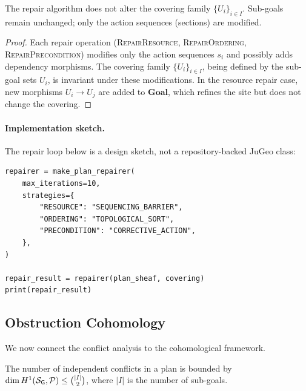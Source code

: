 \documentclass[11pt]{article}
\newcommand{\PlanSheaf}{\mathcal{P}}
\newcommand{\GoalSite}{\Site_{\mathsf{G}}}
\newcommand{\SubGoal}[1]{U_{#1}}
\newcommand{\CoverFam}{\{U_i\}_{i \in I}}
\newcommand{\GoalCat}{\mathbf{Goal}}
\begin{document}
\begin{lemma}\label{lem:repair-cover}
  The repair algorithm does not alter the covering family
  $\CoverFam$.  Sub-goals remain unchanged; only the action
  sequences (sections) are modified.
\end{lemma}

\begin{proof}
  Each repair operation (\textsc{RepairResource},
  \textsc{RepairOrdering}, \textsc{RepairPrecondition}) modifies
  only the action sequences $s_i$ and possibly adds dependency
  morphisms.  The covering family $\CoverFam$, being defined
  by the sub-goal sets $\SubGoal{i}$, is invariant under these
  modifications.  In the resource repair case, new morphisms
  $\SubGoal{i} \to \SubGoal{j}$ are added to $\GoalCat$, which
  refines the site but does not change the covering.
\end{proof}

\paragraph{Implementation sketch.}
The repair loop below is a design sketch, not a repository-backed JuGeo
class:

\begin{lstlisting}
repairer = make_plan_repairer(
    max_iterations=10,
    strategies={
        "RESOURCE": "SEQUENCING_BARRIER",
        "ORDERING": "TOPOLOGICAL_SORT",
        "PRECONDITION": "CORRECTIVE_ACTION",
    },
)

repair_result = repairer(plan_sheaf, covering)
print(repair_result)
\end{lstlisting}

\subsection{Obstruction Cohomology}\label{ssec:obstruction-coh}

We now connect the conflict analysis to the cohomological
framework.

\begin{proposition}\label{prop:obs-dim}
  The number of independent conflicts in a plan is bounded by
  $\dim \Hcoh{1}(\GoalSite, \PlanSheaf) \leq \binom{|I|}{2}$,
  where $|I|$ is the number of sub-goals.
\end{proposition}
\end{document}
